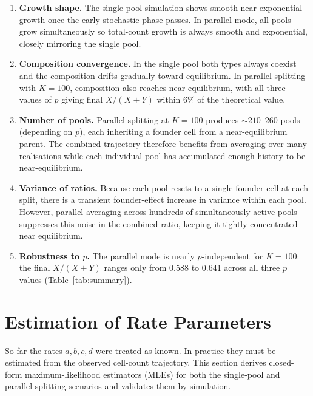 \documentclass[12pt]{article}
\begin{document}
\begin{enumerate}
  \item \textbf{Growth shape.}  The single-pool simulation shows smooth
        near-exponential growth once the early stochastic phase passes.
        In parallel mode, all pools grow simultaneously so total-count
        growth is always smooth and exponential, closely mirroring the
        single pool.

  \item \textbf{Composition convergence.}  In the single pool both types
        always coexist and the composition drifts gradually toward equilibrium.
        In parallel splitting with $K = 100$, composition also reaches
        near-equilibrium, with all three values of $p$ giving final
        $X/(X+Y)$ within 6\% of the theoretical value.

  \item \textbf{Number of pools.}  Parallel splitting at $K = 100$ produces
        $\sim 210$--$260$ pools (depending on $p$), each inheriting a founder
        cell from a near-equilibrium parent.  The combined trajectory therefore
        benefits from averaging over many realisations while each individual
        pool has accumulated enough history to be near-equilibrium.

  \item \textbf{Variance of ratios.}  Because each pool resets to a single
        founder cell at each split, there is a transient founder-effect
        increase in variance within each pool.  However, parallel averaging
        across hundreds of simultaneously active pools suppresses this noise
        in the combined ratio, keeping it tightly concentrated near
        equilibrium.

  \item \textbf{Robustness to $p$.}  The parallel mode is nearly $p$-independent
        for $K = 100$: the final $X/(X+Y)$ ranges only from 0.588 to 0.641
        across all three $p$ values (Table~\ref{tab:summary}).%
\end{enumerate}


\section{Estimation of Rate Parameters}
\label{sec:estimation}

So far the rates $a, b, c, d$ were treated as known.  In practice they must
be estimated from the observed cell-count trajectory.  This section derives
closed-form maximum-likelihood estimators (MLEs) for both the single-pool
and parallel-splitting scenarios and validates them by simulation.
\end{document}

